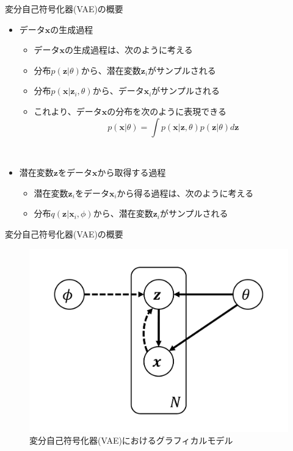 \documentclass[dvipdfmx,notheorems,t]{beamer}
\begin{document}
\begin{frame}{変分自己符号化器(VAE)の概要}

\begin{itemize}
	\item データ$\bm{x}$の生成過程
	\begin{itemize}
		\item データ$\bm{x}$の生成過程は、次のように考える
		\newline
		\item 分布\color{red}$p(\bm{z} | \theta)$\normalcolor から、潜在変数$\bm{z}_i$がサンプルされる
		\item 分布\color{red}$p(\bm{x} | \bm{z}_i, \theta)$\normalcolor から、データ$\bm{x}_i$がサンプルされる
		\newline
		
		\item これより、データ$\bm{x}$の分布を次のように表現できる
		\begin{equation}
			p(\bm{x} | \theta) = \int p(\bm{x} | \bm{z}, \theta) p(\bm{z} | \theta) d\bm{z}
		\end{equation}
	\end{itemize} \
	
	\item 潜在変数$\bm{z}$をデータ$\bm{x}$から取得する過程
	\begin{itemize}
		\item 潜在変数$\bm{z}_i$をデータ$\bm{x}_i$から得る過程は、次のように考える
		\newline
		\item 分布\color{red}$q(\bm{z} | \bm{x}_i, \phi)$\normalcolor から、潜在変数$\bm{z}_i$がサンプルされる
	\end{itemize}
\end{itemize}

\end{frame}

\begin{frame}{変分自己符号化器(VAE)の概要}

\begin{figure}
	\centering
	\includegraphics[keepaspectratio,scale=0.2]{vae-graphical-model.pdf}
	\caption{変分自己符号化器(VAE)におけるグラフィカルモデル}
	\label{fig:vae-graphical-model}
\end{figure}

\end{frame}
\end{document}
